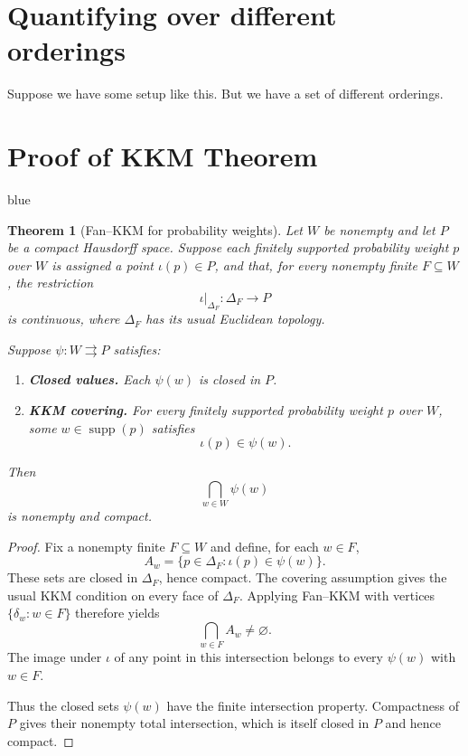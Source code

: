 \documentclass[11pt]{article}
\newtheorem{theorem}{Theorem}[section]
\theoremstyle{definition}
\theoremstyle{remark}
\newcommand{\supp}{\operatorname{supp}}
\newenvironment{AIwritten}{\begin{color}{blue}}{\end{color}}
\begin{document}
\section{Quantifying over different orderings}

Suppose we have some setup like this. But we have a set of different orderings. 





\appendix

\section{Proof of KKM Theorem}
\label{appendix:KKMthm} 


\newpage 
\begin{AIwritten}


\begin{theorem}[Fan--KKM for probability weights]
	\label{thm:KKM}
	Let $W$ be nonempty and let $P$ be a compact
	Hausdorff space. Suppose each finitely supported
	probability weight $p$ over $W$ is assigned a point
	$\iota(p)\in P$, and that, for every nonempty finite
	$F\subseteq W$, the restriction
	\[
	\iota|_{\Delta_F}\colon\Delta_F\to P
	\]
	is continuous, where $\Delta_F$ has its usual
	Euclidean topology.
	
	Suppose $\psi\colon W\rightrightarrows P$ satisfies:
	\begin{enumerate}
		\item \textbf{Closed values.}
		Each $\psi(w)$ is closed in $P$.
		
		\item \textbf{KKM covering.}
		For every finitely supported probability
		weight $p$ over $W$, some $w\in\supp(p)$
		satisfies
		\[
		\iota(p)\in\psi(w).
		\]
	\end{enumerate}
	Then
	\[
	\bigcap_{w\in W}\psi(w)
	\]
	is nonempty and compact.
\end{theorem}

\begin{proof}
	Fix a nonempty finite $F\subseteq W$ and define,
	for each $w\in F$,
	\[
	A_w=\{p\in\Delta_F:\iota(p)\in\psi(w)\}.
	\]
	These sets are closed in $\Delta_F$, hence compact.
	The covering assumption gives the usual KKM
	condition on every face of $\Delta_F$.
	Applying Fan--KKM with vertices
	$\{\delta_w:w\in F\}$ therefore yields
	\[
	\bigcap_{w\in F}A_w\neq\varnothing.
	\]
	The image under $\iota$ of any point in this
	intersection belongs to every $\psi(w)$
	with $w\in F$.
	
	Thus the closed sets $\psi(w)$ have the finite
	intersection property. Compactness of $P$ gives
	their nonempty total intersection, which is
	itself closed in $P$ and hence compact.
\end{proof}

\end{AIwritten}
\end{document}
